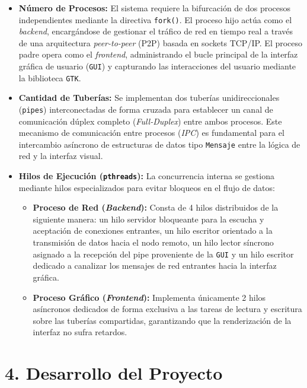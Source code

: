 \documentclass[12pt]{article}
\begin{document}
\begin{itemize}
    \item \textbf{Número de Procesos:} El sistema requiere la bifurcación de dos procesos independientes mediante la directiva \texttt{fork()}. El proceso hijo actúa como el \textit{backend}, encargándose de gestionar el tráfico de red en tiempo real a través de una arquitectura \textit{peer-to-peer} (P2P) basada en sockets TCP/IP. El proceso padre opera como el \textit{frontend}, administrando el bucle principal de la interfaz gráfica de usuario (\texttt{GUI}) y capturando las interacciones del usuario mediante la biblioteca \texttt{GTK}.
    
    \item \textbf{Cantidad de Tuberías:} Se implementan dos tuberías unidireccionales (\texttt{pipes}) interconectadas de forma cruzada para establecer un canal de comunicación dúplex completo (\textit{Full-Duplex}) entre ambos procesos. Este mecanismo de comunicación entre procesos (\textit{IPC}) es fundamental para el intercambio asíncrono de estructuras de datos tipo \texttt{Mensaje} entre la lógica de red y la interfaz visual.
    
    \item \textbf{Hilos de Ejecución (\texttt{pthreads}):} La concurrencia interna se gestiona mediante hilos especializados para evitar bloqueos en el flujo de datos:
    \begin{itemize}
        \item \textbf{Proceso de Red (\textit{Backend}):} Consta de 4 hilos distribuidos de la siguiente manera: un hilo servidor bloqueante para la escucha y aceptación de conexiones entrantes, un hilo escritor orientado a la transmisión de datos hacia el nodo remoto, un hilo lector síncrono asignado a la recepción del pipe proveniente de la \texttt{GUI} y un hilo escritor dedicado a canalizar los mensajes de red entrantes hacia la interfaz gráfica.
        \item \textbf{Proceso Gráfico (\textit{Frontend}):} Implementa únicamente 2 hilos asíncronos dedicados de forma exclusiva a las tareas de lectura y escritura sobre las tuberías compartidas, garantizando que la renderización de la interfaz no sufra retardos.
    \end{itemize}
\end{itemize}

\newpage
\section{\large 4. Desarrollo del Proyecto}











\end{document}

